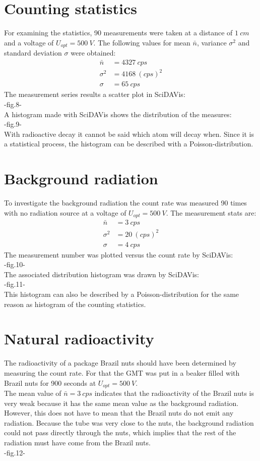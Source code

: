 \section{Counting statistics}
%
For examining the statistics, 90 measurements were taken at a distance of $ \SI{1}{cm} $ and a voltage of
$ U_{opt}=\SI{500}{V} $. The following values for mean $ \bar{n} $, variance $ \sigma^{2} $ and standard deviation
$ \sigma $ were obtained:
%
\begin{align*}
    \bar{n}&=\SI{4327}{cps} \\
    \sigma^{2}&=\SI{4168}{(cps)^{2}} \\
    \sigma&=\SI{65}{cps}
\end{align*}
The measurement series results a scatter plot in SciDAVis:\\
-fig.8-\\
A histogram made with SciDAVis shows the distribution of the measures:\\ 
-fig.9-\\
With radioactive decay it cannot be said which atom will decay when. Since it is a statistical process, the histogram
can be described with a Poisson-distribution.
%
\section{Background radiation}
%
To investigate the background radiation the count rate was measured 90 times with no radiation source at a voltage of
$ U_{opt}=\SI{500}{V} $. The measurement stats are:
%
\begin{align*}
    \bar{n}&=\SI{3}{cps} \\
    \sigma^{2}&=\SI{20}{(cps)^{2}} \\
    \sigma&=\SI{4}{cps}
\end{align*}
The measurement number was plotted versus the count rate by SciDAVis:\\
-fig.10-\\
The associated distribution histogram was drawn by SciDAVis:\\
-fig.11-\\
This histogram can also be described by a Poisson-distribution for the same reason as histogram of the counting
statistics.
%
\section{Natural radioactivity}
%
The radioactivity of a package Brazil nuts should have been determined by measuring the count rate. For that the GMT was
put in a beaker filled with Brazil nuts for 900 seconds at $ U_{opt}=\SI{500}{V} $.\\
The mean value of $ \bar{n}=\SI{3}{cps} $ indicates that the radioactivity of the Brazil nuts is very weak because it
has the same mean value as the background radiation. However, this does not have to mean that the Brazil nuts do not emit
any radiation. Because the tube was very close to the nuts, the background radiation could not pass directly through the
nuts, which implies that the rest of the radiation must have come from the Brazil nuts.\\
-fig.12-